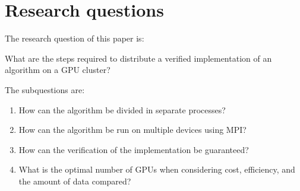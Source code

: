 \section{Research questions} \label{questions}
The research question of this paper is:

What are the steps required to distribute a verified implementation of an algorithm on a GPU cluster?

The subquestions are:
\begin{enumerate}
    \item How can the algorithm be divided in separate processes?
    \item How can the algorithm be run on multiple devices using MPI?
    \item How can the verification of the implementation be guaranteed?
    \item What is the optimal number of GPUs when considering cost, efficiency, and the amount of data compared?
\end{enumerate}

